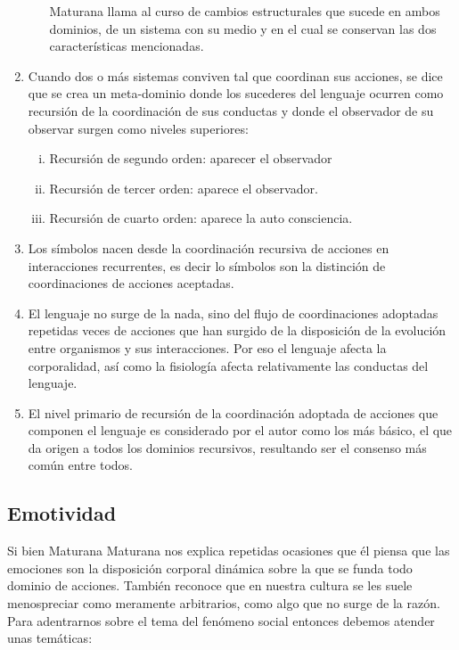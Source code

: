 \documentclass[10pt]{article}
\begin{document}
\begin{enumerate}
\begin{enumerate}[a.]
                Maturana llama al curso de cambios estructurales que sucede en ambos dominios, de un sistema con su medio y en el cual se conservan las dos características mencionadas.
            \end{enumerate}
            \item Cuando dos o más sistemas conviven tal que coordinan sus acciones, se dice que se crea un meta-dominio donde los sucederes del lenguaje ocurren como recursión de la coordinación de sus conductas y donde el observador de su observar surgen como niveles superiores:
            \begin{enumerate}[i.]
                \item Recursión de segundo orden: aparecer el observador
                \item Recursión de tercer orden: aparece el observador.
                \item Recursión de cuarto orden: aparece la auto consciencia.
            \end{enumerate}
            \item Los símbolos nacen desde la coordinación recursiva de acciones en interacciones recurrentes, es decir lo símbolos son la distinción de coordinaciones de acciones aceptadas.
            \item El lenguaje no surge de la nada, sino del flujo de coordinaciones adoptadas repetidas veces de acciones que han surgido de la disposición de la evolución entre organismos y sus interacciones. Por eso el lenguaje afecta la corporalidad, así como la fisiología afecta relativamente las conductas del lenguaje.
            \item El nivel primario de recursión de la coordinación adoptada de acciones que componen el lenguaje es considerado por el autor como los más básico, el que da origen a todos los dominios recursivos, resultando ser el consenso más común entre todos.
        \end{enumerate}

        \subsection{Emotividad}

        Si bien Maturana Maturana nos explica repetidas ocasiones que él piensa que las emociones son la disposición corporal dinámica sobre la que se funda todo dominio de acciones. También reconoce que en nuestra cultura se les suele menospreciar como meramente arbitrarios, como algo que no surge de la razón. Para adentrarnos sobre el tema del fenómeno social entonces debemos atender unas temáticas:
        
\end{document}
